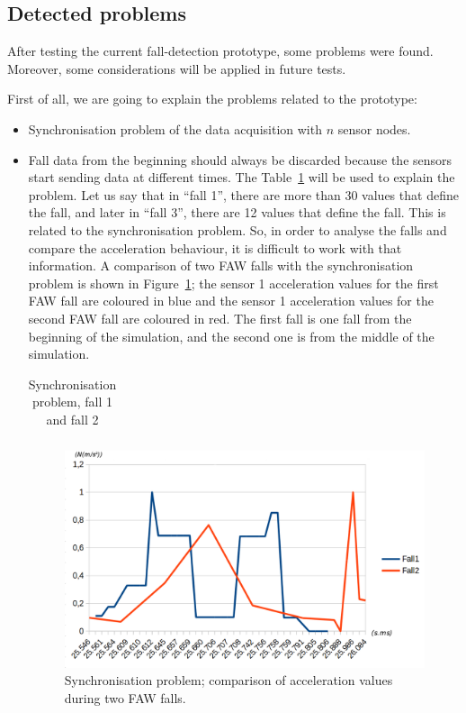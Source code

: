 \documentclass[journal]{IEEEtran}
\begin{document}
\subsection{Detected problems}
\label{sub:detectedproblems}

After testing the current fall-detection prototype, some problems were 
found. Moreover, some considerations will be applied in future tests.

First of all, we are going to explain the problems related to the prototype: 

\begin{itemize}
 \item Synchronisation problem of the data acquisition with $n$ sensor nodes.
 \item Fall data from the beginning should always be discarded because
   the sensors start sending data at different times. The
   Table~\ref{tabla:Synchro} will be used to explain the problem. Let
   us say  
 that in ``fall 1'', there are more than 30 values that define the fall, and later in ``fall 3'', there are 
 12 values that define the fall. This is related to the synchronisation problem. So, in order to analyse the falls and compare the acceleration behaviour, it is 
 difficult to work with that information. A comparison of two FAW falls with the synchronisation problem is shown
 in Figure~\ref{fig:synchronisation1}; the sensor 1 acceleration values for the first FAW fall are coloured in blue and the
 sensor 1 acceleration values for the second FAW fall are coloured in red. The first fall is one fall from the beginning
 of the simulation, and the second one is from the middle of the simulation.
 
 \begin{table}[!ht]
 \centering
 \begin{tabular}{*{5}{r}}
   
 \end{tabular}
 \caption{Synchronisation problem, fall 1 and fall 2}%
 \label{tabla:Synchro}
 \end{table}
 
 \begin{figure}[!ht]
  \centering
  \includegraphics[scale=0.2]{img/synchronisation1.png}
  \caption[Comparison acceleration during two FAW falls]{Synchronisation problem; comparison of acceleration values during two FAW falls.}
  \label{fig:synchronisation1}
 \end{figure}
 

\end{itemize}
\end{document}
